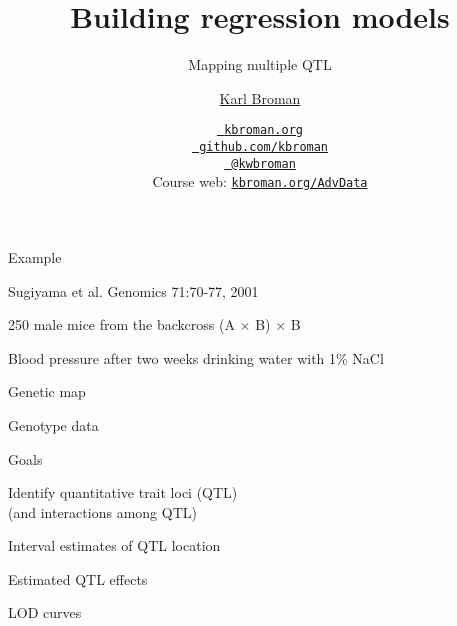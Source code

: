 \documentclass[aspectratio=169,12pt,t]{beamer}
\title{Building regression models}
\subtitle{Mapping multiple QTL}
\author{\href{https://kbroman.org}{Karl Broman}}
\institute{Biostatistics \& Medical Informatics, UW{\textendash}Madison}
\date{\href{https://kbroman.org}{\tt \scriptsize \color{foreground} kbroman.org}
\\[-4pt]
\href{https://github.com/kbroman}{\tt \scriptsize \color{foreground} github.com/kbroman}
\\[-4pt]
\href{https://twitter.com/kwbroman}{\tt \scriptsize \color{foreground} @kwbroman}
\\[-4pt]
{\scriptsize Course web: \href{https://kbroman.org/AdvData}{\tt kbroman.org/AdvData}}
}
\begin{document}
{
 }







\begin{frame}{Example}

\footnotesize
Sugiyama et al. Genomics 71:70-77, 2001

\bi
\item 250 male mice from the backcross (A $\times$ B) $\times$ B
\item Blood pressure after two weeks drinking water with 1\% NaCl
\ei


\end{frame}







\begin{frame}[c]{Genetic map}


\end{frame}





\begin{frame}[c]{Genotype data}


\end{frame}





\begin{frame}{Goals}

\bbi
\item Identify quantitative trait loci (QTL) \\[6pt]
   {\lolit   (and interactions among QTL)}
\item Interval estimates of QTL location
\item Estimated QTL effects
\ei

\end{frame}




\begin{frame}[c]{LOD curves}


\end{frame}
\end{document}
